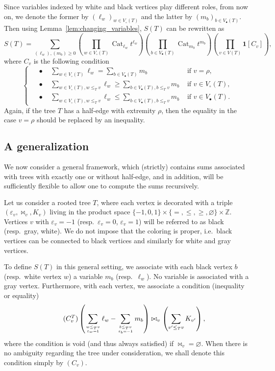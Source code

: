 \documentclass[12pt]{amsart}
\theoremstyle{plain}
\theoremstyle{remark}
\def\eps{\varepsilon}
\def\One{\bm{1}}
\DeclareMathOperator{\Cat}{Cat}
\begin{document}
Since variables indexed by white and black vertices play different roles,
from now on, we denote the former by $(\ell_w)_{w \in V_{\circ}(T)}$ and the latter by
$(m_b)_{b \in V_{\bullet}(T)}$.
Then using Lemma~\ref{lem:changing_variables}, $S(T)$ can be rewritten as
\begin{equation}
\label{ST_with_vertex_variables}
S ( T ) = \sum_{(\ell_w), (m_b) \geq 0}\left( \prod_{w  \in V_{\circ}(T)} \Cat_{\ell_w} t^{\ell_w} \right) 
\left( \prod_{b \in V_{\bullet}(T)} \Cat_{m_b} t^{m_b} \right) \left( \prod_{v \in V(T)} \One[C_v] \right),
\end{equation}
where $C_v$ is the following condition
\[\begin{cases}
\quad\bullet\quad  \sum_{w  \in V_{\circ}(T)} \ell_w = \sum_{b \in V_{\bullet}(T)} m_b&  \text{ if $v =\rho$,} \\
\quad\bullet\quad  \sum_{w  \in V_{\circ}(T), w \le_T v} \ell_w \ge 
\sum_{b \in V_{\bullet}(T), b \le_T v} m_b
 & \text{ if $v \in V_{\circ}(T)$,} \\
\quad\bullet\quad  \sum_{w  \in V_{\circ}(T), w \le_T v} \ell_w \le 
\sum_{b \in V_{\bullet}(T), b \le_T v} m_b
 & \text{ if $v \in V_{\bullet}(T)$.}
\end{cases}\]
Again, if the tree $T$ has a half-edge with extremity $\rho$,
then the equality in the case $v=\rho$ should be replaced by an inequality.

\subsection{A generalization}
\label{ssec:generalization}
We now consider a general framework,
which (strictly) contains sums associated with trees with exactly one or without half-edge,
and in addition, will be sufficiently flexible to allow one to compute the sums recursively.

Let us consider a rooted tree $T$,
where each vertex is decorated with a triple $(\eps_v,\bowtie_v,K_v)$
living in the product space $\{-1,0,1\} \times \{=,\le,\ge,\varnothing\} \times \mathbb Z$.
Vertices $v$ with $\eps_v=-1$ (resp.~$\eps_v=0$, $\eps_v=1$)
will be referred to as black (resp.~gray, white).
We do not impose that the coloring is proper, 
i.e.~black vertices can be connected to black
vertices and similarly for white and gray vertices.

To define $S(T)$ in this general setting, we associate with each black vertex $b$ (resp.~white vertex $w$) a variable $m_b$ (resp.~$\ell_w$). No variable is associated with a gray vertex. Furthermore, with each vertex, we associate a condition (inequality or equality)
\begin{equation}\label{eq:Cv}
  \tag{$C^T_v$} \left(\sum_{w \le_T v \atop \eps_w=1} \ell_w -  \sum_{b \le_T v \atop \eps_b=-1} m_b \right) \bowtie_v \left( \sum_{v' \le_T v} K_{v'} \right),
\end{equation}
where the condition is void (and thus always satisfied) if $\bowtie_v=\varnothing$.
When there is no ambiguity regarding the tree under consideration, 
we shall denote this condition simply by $(C_v)$.
\end{document}
